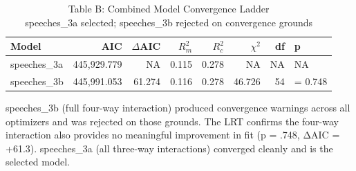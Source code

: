 \begin{table}[t]
\caption*{
{\large Table B: Combined Model Convergence Ladder} \\ 
{\small speeches\_3a selected; speeches\_3b rejected on convergence grounds}
} 
\fontsize{12.0pt}{14.4pt}\selectfont
\begin{tabular*}{\linewidth}{@{\extracolsep{\fill}}lrrrrrrl}
\toprule
Model & AIC & $\Delta$AIC & $R^2_m$ & $R^2_c$ & $\chi^2$ & df & p \\ 
\midrule\addlinespace[2.5pt]
speeches\_3a & 445,929.779 & NA & 0.115 & 0.278 & NA & NA & NA \\ 
speeches\_3b & 445,991.053 & 61.274 & 0.116 & 0.278 & 46.726 & 54 & = 0.748 \\ 
\bottomrule
\end{tabular*}
\begin{minipage}{\linewidth}
speeches\_3b (full four-way interaction) produced convergence warnings across all optimizers and was rejected on those grounds. The LRT confirms the four-way interaction also provides no meaningful improvement in fit (p = .748, ΔAIC = +61.3). speeches\_3a (all three-way interactions) converged cleanly and is the selected model.\\
\end{minipage}
\end{table}

